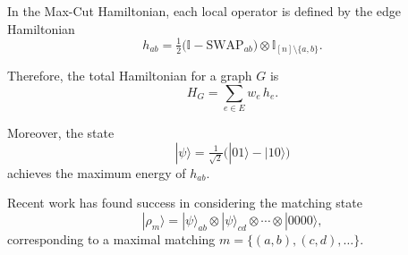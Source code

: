 \documentclass[11pt]{article}
\begin{document}
In the Max-Cut Hamiltonian, each local operator is defined by the edge Hamiltonian
\[
	h_{ab} = \tfrac{1}{2}\bigl(\mathbb{I} - \mathrm{SWAP}_{ab}\bigr)\otimes \mathbb{I}_{[n]\setminus\{a,b\}}.
\]

Therefore, the total Hamiltonian for a graph $G$ is
\[
	H_G = \sum_{e\in E} w_e\, h_e.
\]

Moreover, the state
\[
	|\psi\rangle = \tfrac{1}{\sqrt{2}}\bigl(|01\rangle - |10\rangle\bigr)
\]
achieves the maximum energy of $h_{ab}$.

Recent work has found success in considering the matching state
\[
	|\rho_m\rangle = |\psi\rangle_{ab} \otimes |\psi\rangle_{cd} \otimes \cdots \otimes |0000\rangle,
\]
corresponding to a maximal matching $m = \{(a,b), (c,d), \ldots\}$.
\end{document}
